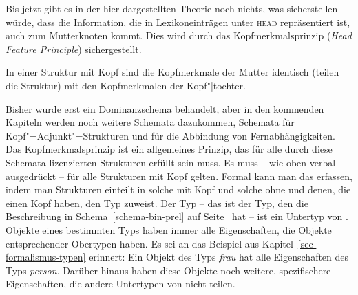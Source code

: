 Bis jetzt gibt es in der hier dargestellten Theorie noch nichts, was sicherstellen
würde, dass die Information, die in Lexikoneinträgen unter \textsc{head} repräsentiert
ist, auch zum Mutterknoten kommt. Dies wird durch das Kopfmerkmalsprinzip (\emph{Head Feature Principle})
sichergestellt.
\begin{prinzip-break}
\label{prinzip-hfp}
In einer Struktur mit Kopf sind die Kopfmerkmale der Mutter identisch (teilen die Struktur)
mit den Kopfmerkmalen der Kopf"|tochter.
\end{prinzip-break}
Bisher wurde erst ein Dominanzschema behandelt, aber in den kommenden Kapiteln werden
noch weitere Schemata dazukommen, \zb Schemata für Kopf"=Adjunkt"=Strukturen und
für die Abbindung von Fernabhängigkeiten. Das Kopfmerkmalsprinzip ist ein allgemeines Prinzip,
das für alle durch diese Schemata lizenzierten Strukturen erfüllt sein muss. Es muss --
wie oben verbal ausgedrückt -- für alle Strukturen mit Kopf gelten. Formal kann man
das erfassen, indem man Strukturen einteilt in solche mit Kopf und solche ohne
und denen, die einen Kopf haben, den Typ  zuweist.
Der Typ  -- das ist der Typ, den die Beschreibung in
Schema~\ref{schema-bin-prel} auf Seite~\pageref{schema-bin-prel} hat -- ist ein Untertyp
von . Objekte eines bestimmten Typs haben immer 
alle Eigenschaften, die Objekte entsprechender Obertypen haben. Es sei an das Beispiel
aus Kapitel~\ref{sec-formalismus-typen} erinnert: Ein Objekt des Typs \textit{frau}
hat alle Eigenschaften des Typs \textit{person}. Darüber hinaus haben diese Objekte
noch weitere, spezifischere Eigenschaften, die andere Untertypen von 
nicht teilen.

